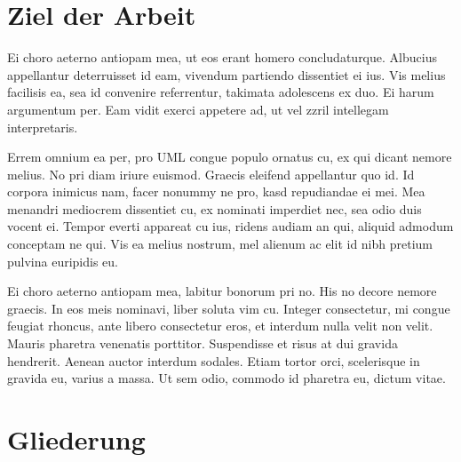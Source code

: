 %
%
\section{Ziel der Arbeit}
\label{sec:intro:goal}
Ei choro aeterno antiopam mea, ut eos erant homero concludaturque. Albucius appellantur deterruisset id eam, vivendum partiendo dissentiet ei ius. Vis melius facilisis ea, sea id convenire referrentur, takimata adolescens ex duo. Ei harum argumentum per. Eam vidit exerci appetere ad, ut vel zzril intellegam interpretaris.

Errem omnium ea per, pro \ac{UML} congue populo ornatus cu, ex qui dicant nemore melius. No pri diam iriure euismod. Graecis eleifend appellantur quo id. Id corpora inimicus nam, facer nonummy ne pro, kasd repudiandae ei mei. Mea menandri mediocrem dissentiet cu, ex nominati imperdiet nec, sea odio duis vocent ei. Tempor everti appareat cu ius, ridens audiam an qui, aliquid admodum conceptam ne qui. Vis ea melius nostrum, mel alienum ac elit id nibh pretium pulvina euripidis eu.

Ei choro aeterno antiopam mea, labitur bonorum pri no. His no decore nemore graecis. In eos meis nominavi, liber soluta vim cu. Integer consectetur, mi congue feugiat rhoncus, ante libero consectetur eros, et interdum nulla velit non velit. Mauris pharetra venenatis porttitor. Suspendisse et risus at dui gravida hendrerit. Aenean auctor interdum sodales. Etiam tortor orci, scelerisque in gravida eu, varius a massa. Ut sem odio, commodo id pharetra eu, dictum vitae. 

%
%
\section{Gliederung}
\label{sec:intro:structure}